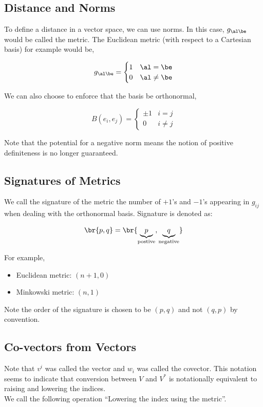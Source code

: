\documentclass{article}
\newcommand{\piecewise}[4]{
    \begin{cases}
        #1 & #2 \\
        #3 & #4
    \end{cases}
}
\begin{document}
\subsection{Distance and Norms}

To define a distance in a vector space, we can use norms. In this case, $g_{\al\be}$ would be called the metric. The Euclidean metric (with respect to a Cartesian basis) for example would be,

\[ g_{\al\be} = \piecewise{1}{\al = \be}{0}{\al \neq \be}  \]

We can also choose to enforce that the basis be orthonormal,

\[ B(e_i, e_j) = \piecewise{\pm1}{i = j}{0}{i \neq j} \]

Note that the potential for a negative norm means the notion of positive definiteness is no longer guaranteed.

\subsection{Signatures of Metrics}

We call the signature of the metric the number of $+1$'s and $-1$'s appearing in $g_{ij}$ when dealing with the orthonormal basis. Signature is denoted as:

\[ \br{p, q} = \br{\underbrace{p}_{\text{postive}}, \underbrace{q}_{\text{negative}}} \]

For example,

\begin{itemize}
    \item Euclidean metric: $(n+1, 0)$
    \item Minkowski metric: $(n, 1)$
\end{itemize}

Note the order of the signature is chosen to be $(p,q)$ and not $(q, p)$ by convention.

\subsection{Co-vectors from Vectors}

Note that $v^i$ was called the vector and $w_i$ was called the covector. This notation seems to indicate that conversion between $V$ and $V^*$ is notationally equivalent to raising and lowering the indices. \\

We call the following operation ``Lowering the index using the metric''.
\end{document}
